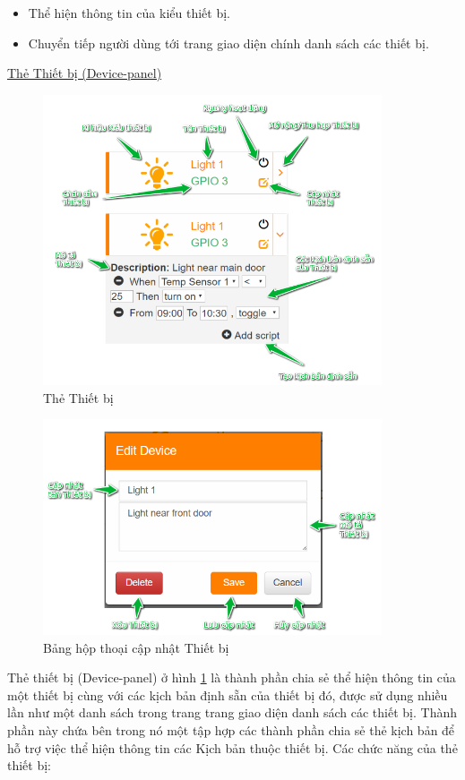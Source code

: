 \documentclass[12pt,a4paper,oneside]{extbook}
\begin{document}
\begin{itemize}[topsep=1mm,itemsep=-0.5mm]
\item Thể hiện thông tin của kiểu thiết bị.
\item Chuyển tiếp người dùng tới trang giao diện chính danh sách các thiết bị.
\vspace{1mm}
\end{itemize}

\noindent
\underline{Thẻ Thiết bị (Device-panel)}

\begin{figure}[h]
  \centering
     \includegraphics[width=10cm]{6-device-panel}
  \caption{Thẻ Thiết bị}\label{fig:6-device-panel}
\end{figure}

\begin{figure}[h!]
  \centering
     \includegraphics[width=10cm]{6-EditDevice}
  \caption{Bảng hộp thoại cập nhật Thiết bị}\label{fig:6-EditDevice}
\end{figure}

\noindent
Thẻ thiết bị (Device-panel) ở hình \ref{fig:6-device-panel} là thành phần chia sẻ thể hiện thông tin của một thiết bị cùng với các kịch bản định sẵn của thiết bị đó, được sử dụng nhiều lần như một danh sách trong trang trang giao diện danh sách các thiết bị. Thành phần này chứa bên trong nó một tập hợp các thành phần chia sẻ thẻ kịch bản để hỗ trợ việc thể hiện thông tin các Kịch bản thuộc thiết bị. Các chức năng của thẻ thiết bị:
\end{document}
